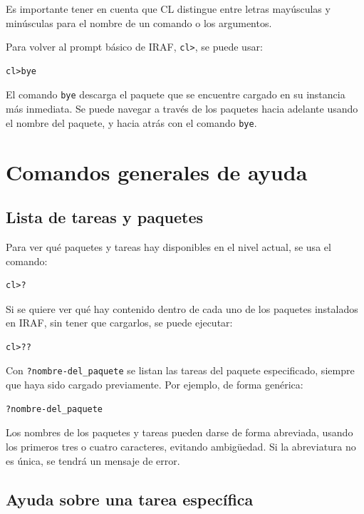 Es importante tener en cuenta que CL distingue entre letras mayúsculas y minúsculas para el nombre de un comando o los argumentos.

Para volver al prompt básico de IRAF, \texttt{cl>}, se puede usar:

\begin{verbatim}
cl>bye
\end{verbatim}

El comando \texttt{bye} descarga el paquete que se encuentre cargado en su instancia más inmediata. Se puede navegar a través de los paquetes hacia adelante usando el nombre del paquete, y hacia atrás con el comando \texttt{bye}.

\section{Comandos generales de ayuda}

\subsection{Lista de tareas y paquetes}

Para ver qué paquetes y tareas hay disponibles en el nivel actual, se usa el comando:

\begin{verbatim}
cl>?
\end{verbatim}

Si se quiere ver qué hay contenido dentro de cada uno de los paquetes instalados en IRAF, sin tener que cargarlos, se puede ejecutar:

\begin{verbatim}
cl>??
\end{verbatim}

Con \texttt{?nombre-del\_paquete} se listan las tareas del paquete especificado, siempre que haya sido cargado previamente. Por ejemplo, de forma genérica:

\begin{verbatim}
?nombre-del_paquete
\end{verbatim}

Los nombres de los paquetes y tareas pueden darse de forma abreviada, usando los primeros tres o cuatro caracteres, evitando ambigüedad. Si la abreviatura no es única, se tendrá un mensaje de error.

\subsection{Ayuda sobre una tarea específica}

